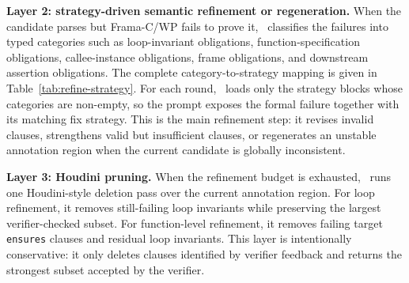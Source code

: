 \DIFaddbegin
\textbf{Layer 2: strategy-driven semantic refinement or regeneration.}
When the candidate parses but Frama-C/WP fails to prove it, \toolname\ classifies the failures into typed categories such as loop-invariant obligations, function-specification obligations, callee-instance obligations, frame obligations, and downstream assertion obligations. The complete category-to-strategy mapping is given in Table~\ref{tab:refine-strategy}. For each round, \toolname\ loads only the strategy blocks whose categories are non-empty, so the prompt exposes the formal failure together with its matching fix strategy. This is the main refinement step: it revises invalid clauses, strengthens valid but insufficient clauses, or regenerates an unstable annotation region when the current candidate is globally inconsistent. 
\DIFaddend

\DIFaddbegin
\textbf{Layer 3: Houdini pruning.}
When the refinement budget is exhausted, \toolname\ runs one Houdini-style deletion pass over the current annotation region. For loop refinement, it removes still-failing loop invariants while preserving the largest verifier-checked subset. For function-level refinement, it removes failing target \texttt{ensures} clauses and residual loop invariants. This layer is intentionally conservative: it only deletes clauses identified by verifier feedback and returns the strongest subset accepted by the verifier.
\DIFaddend

